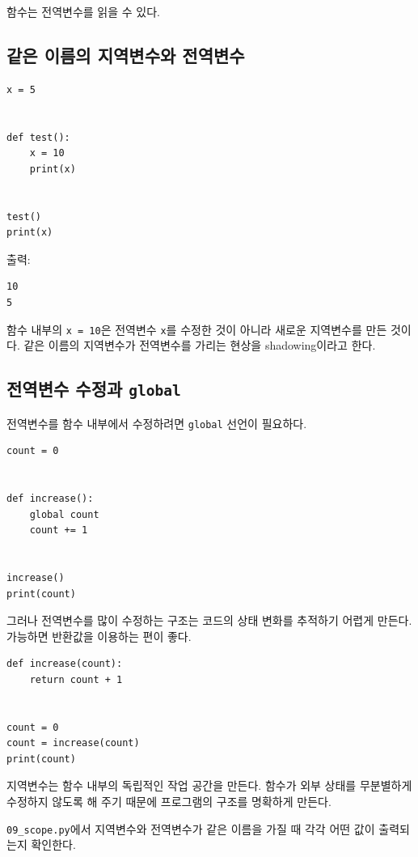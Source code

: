 \documentclass[11pt,a4paper]{article}
\begin{document}
함수는 전역변수를 읽을 수 있다.

\subsection{같은 이름의 지역변수와 전역변수}

\begin{lstlisting}
x = 5


def test():
    x = 10
    print(x)


test()
print(x)
\end{lstlisting}

출력:

\begin{verbatim}
10
5
\end{verbatim}

함수 내부의 \texttt{x = 10}은 전역변수 \texttt{x}를 수정한 것이 아니라 새로운 지역변수를 만든 것이다. 같은 이름의 지역변수가 전역변수를 가리는 현상을 shadowing이라고 한다.

\subsection{전역변수 수정과 \texttt{global}}

전역변수를 함수 내부에서 수정하려면 \texttt{global} 선언이 필요하다.

\begin{lstlisting}
count = 0


def increase():
    global count
    count += 1


increase()
print(count)
\end{lstlisting}

그러나 전역변수를 많이 수정하는 구조는 코드의 상태 변화를 추적하기 어렵게 만든다. 가능하면 반환값을 이용하는 편이 좋다.

\begin{lstlisting}
def increase(count):
    return count + 1


count = 0
count = increase(count)
print(count)
\end{lstlisting}

\begin{importantbox}
지역변수는 함수 내부의 독립적인 작업 공간을 만든다. 함수가 외부 상태를 무분별하게 수정하지 않도록 해 주기 때문에 프로그램의 구조를 명확하게 만든다.
\end{importantbox}

\begin{practicebox}
\texttt{09\_scope.py}에서 지역변수와 전역변수가 같은 이름을 가질 때 각각 어떤 값이 출력되는지 확인한다.
\end{practicebox}
\end{document}
